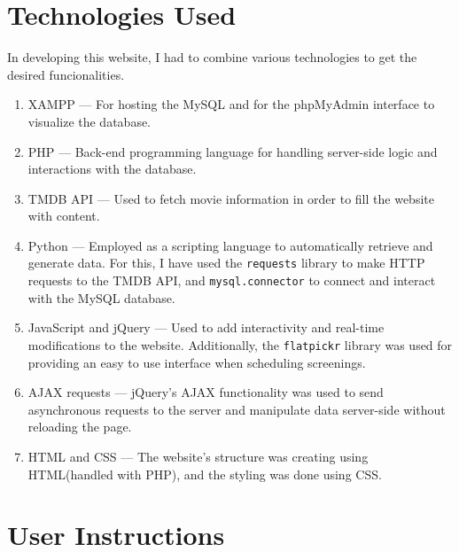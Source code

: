 \documentclass[a4paper]{article}
\begin{document}
\section{Technologies Used}

In developing this website, I had to combine various technologies to get the desired funcionalities.

\begin{enumerate}[label=$-$]
    \item XAMPP --- For hosting the MySQL and for the phpMyAdmin interface to visualize the database.
    \item PHP --- Back-end programming language for handling server-side logic and interactions with the database.
    \item TMDB API --- Used to fetch movie information in order to fill the website with content.
    \item Python --- Employed as a scripting language to automatically retrieve and generate data. For this, I have used the \texttt{requests} library to make HTTP requests to the TMDB API, and \texttt{mysql.connector} to connect and interact with the MySQL database.
    \item JavaScript and jQuery --- Used to add interactivity and real-time modifications to the website. Additionally, the \texttt{flatpickr} library was used for providing an easy to use interface when scheduling screenings.
    \item AJAX requests --- jQuery's AJAX functionality was used to send asynchronous requests to the server and manipulate data server-side without reloading the page.
    \item HTML and CSS --- The website's structure was creating using HTML(handled with PHP), and the styling was done using CSS.
\end{enumerate}

\section*{User Instructions}
\label{sec:manual}
\end{document}
